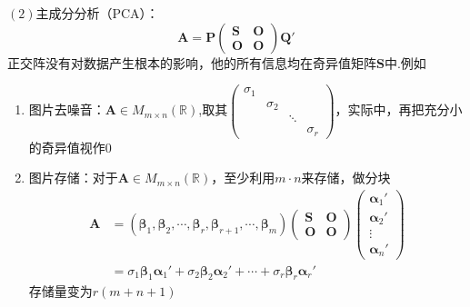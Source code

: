 $(2)$主成分分析（PCA）：\[
    \bm{A}=\bm{P}\begin{pmatrix}
        \bm{S} & \bm{O} \\
        \bm{O} & \bm{O}
    \end{pmatrix}\bm{Q}'
\]正交阵没有对数据产生根本的影响，他的所有信息均在奇异值矩阵$\bm{S}$中.例如\begin{enumerate}[label=\arabic*）]
    \item 图片去噪音：$\bm{A}\in M_{m\times n}\left(\mathbb{R}\right)$,取其$\begin{pmatrix}
                  \sigma_1 &          &        &          \\
                           & \sigma_2 &        &          \\
                           &          & \ddots &          \\
                           &          &        & \sigma_r
              \end{pmatrix}$，实际中，再把充分小的奇异值视作$0$
    \item 图片存储：对于$\bm{A}\in M_{m\times n}\left(\mathbb{R}\right)$，至少利用$m\cdot n$来存储，做分块\begin{align*}
              \bm{A} & =\left(
              \bm{\beta}_1,\bm{\beta}_2,\cdots,\bm{\beta}_r,\bm{\beta}_{r+1},\cdots,\bm{\beta}_m
              \right)\begin{pmatrix}
                         \bm{S} & \bm{O} \\
                         \bm{O} & \bm{O}
                     \end{pmatrix}\begin{pmatrix}
                                      \bm{\alpha}_1' \\\bm{\alpha}_2'\\\vdots\\\bm{\alpha}_n'
                                  \end{pmatrix}                                                \\
                     & =\sigma_1\bm{\beta}_1\bm{\alpha}_1'+\sigma_2\bm{\beta}_2\bm{\alpha}_2'+\cdots+\sigma_r\bm{\beta}_r\bm{\alpha}_r'
          \end{align*}存储量变为$r\left(
              m+n+1
              \right)$
\end{enumerate}

